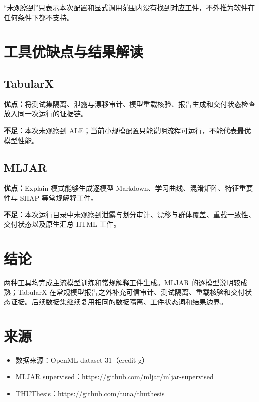 \documentclass[degree=bachelor,language=chinese,fontset=fandol]{thuthesis}
\begin{document}
“未观察到”只表示本次配置和显式调用范围内没有找到对应工件，不外推为软件在任何条件下都不支持。

\chapter{工具优缺点与结果解读}
\section{TabularX}
\textbf{优点：}将测试集隔离、泄露与漂移审计、模型重载核验、报告生成和交付状态检查放入同一次运行的证据链。

\textbf{不足：}本次未观察到 ALE；当前小规模配置只能说明流程可运行，不能代表最优模型性能。

\section{MLJAR}
\textbf{优点：}Explain 模式能够生成逐模型 Markdown、学习曲线、混淆矩阵、特征重要性与 SHAP 等常规解释工件。

\textbf{不足：}本次运行目录中未观察到泄露与划分审计、漂移与群体覆盖、重载一致性、交付状态以及原生汇总 HTML 工件。

\chapter{结论}
两种工具均完成主流模型训练和常规解释工件生成。MLJAR 的逐模型说明较成熟；TabularX 在常规模型报告之外补充可信审计、测试隔离、重载核验和交付状态证据。后续数据集继续复用相同的数据隔离、工件状态词和结果边界。

\backmatter
\chapter{来源}
\begin{itemize}
  \item 数据来源：OpenML dataset 31（credit-g）
  \item MLJAR supervised：\url{https://github.com/mljar/mljar-supervised}
  \item THUThesis：\url{https://github.com/tuna/thuthesis}
\end{itemize}
\end{document}
